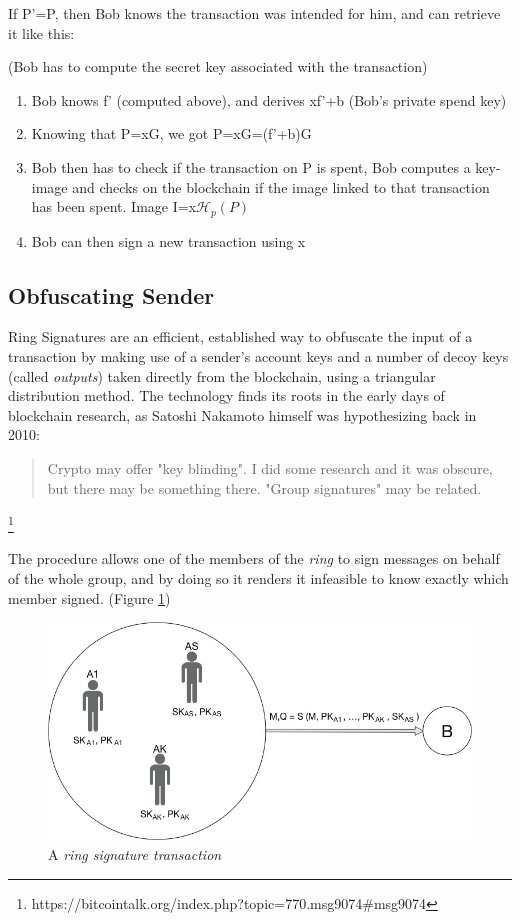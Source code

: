 If P'=P, then Bob knows the transaction was intended for him, and can retrieve it like this:

(Bob has to compute the secret key associated with the transaction)

\begin{enumerate}
\item Bob knows f' (computed above), and derives xf'+b  (Bob's private spend key)
\item Knowing that P=xG, we got P=xG=(f'+b)G
\item Bob then has to check if the transaction on P is spent, Bob computes a key-image and checks on the blockchain if the image linked to that transaction has been spent. Image I=x$\mathcal{H}_p(P)$
\item Bob can then sign a new transaction using x
\end{enumerate}

\subsection{Obfuscating Sender}

Ring Signatures are an efficient, established way to obfuscate the input of a transaction by making use of a sender's account keys and a number of decoy keys (called \textit{outputs}) taken directly from the blockchain, using a triangular distribution method. The technology finds its roots in the early days of blockchain research, as Satoshi Nakamoto himself was hypothesizing back in 2010:


\blockquote{Crypto may offer "key blinding". I did some research and it was obscure, but there may be something there. "Group signatures" may be related.} \footnote{https://bitcointalk.org/index.php?topic=770.msg9074\#msg9074}

The procedure allows one of the members of the \textit{ring} to sign messages on behalf of the whole group, and by doing so it renders it infeasible to know exactly which member signed. (Figure \ref{fig:ringsig})

\begin{figure}
\includegraphics[scale=0.35]{ringsig}
\caption{A \textit{ring signature transaction}}
\label{fig:ringsig}
\end{figure}

